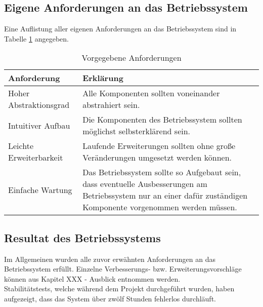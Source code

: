 \subsection{Eigene Anforderungen an das Betriebssystem}
Eine Auflistung aller eigenen Anforderungen an das Betriebssystem sind in Tabelle \ref{table:Own-Requirements} angegeben.

\begin{table}[H]
\begin{tabular}{ p{5cm}| p{9cm} }
  \textbf{Anforderung} & \textbf{Erklärung} \\ 
  \hline
  Hoher Abstraktionsgrad & Alle Komponenten sollten voneinander abstrahiert sein. \\
  Intuitiver Aufbau & Die Komponenten des Betriebssystem sollten möglichst selbsterklärend sein. \\
  Leichte Erweiterbarkeit & Laufende Erweiterungen sollten ohne große Veränderungen umgesetzt werden können. \\
  Einfache Wartung & Das Betriebssystem sollte so Aufgebaut sein, dass eventuelle Ausbesserungen am Betriebssystem nur an einer dafür zuständigen Komponente vorgenommen werden müssen. \\
 \end{tabular}
 \caption{Vorgegebene Anforderungen}
 \label{table:Own-Requirements}
\end{table}

\subsection{Resultat des Betriebssystems}
Im Allgemeinen wurden alle zuvor erwähnten Anforderungen an das Betriebssystem erfüllt. Einzelne Verbesserungs- bzw. Erweiterungsvorschläge können aus Kapitel XXX - Ausblick entnommen werden. \\
Stabilitätstests, welche während dem Projekt durchgeführt wurden, haben aufgezeigt, dass das System über zwölf Stunden fehlerlos durchläuft.

\pagebreak 